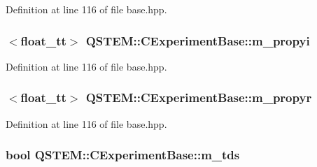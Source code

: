 Definition at line 116 of file base.\-hpp.

\hypertarget{class_q_s_t_e_m_1_1_c_experiment_base_a433626e322c45071ece6c2fe6490a0fa}{
\subsubsection[{m\-\_\-propyi}]{$<${\bf float\-\_\-tt}$>$ Q\-S\-T\-E\-M\-::\-C\-Experiment\-Base\-::m\-\_\-propyi\hspace{0.3cm}{\ttfamily [protected]}}}\label{class_q_s_t_e_m_1_1_c_experiment_base_a433626e322c45071ece6c2fe6490a0fa}


Definition at line 116 of file base.\-hpp.

\hypertarget{class_q_s_t_e_m_1_1_c_experiment_base_a4416f0b049a617d05979a896b97422b3}{
\subsubsection[{m\-\_\-propyr}]{$<${\bf float\-\_\-tt}$>$ Q\-S\-T\-E\-M\-::\-C\-Experiment\-Base\-::m\-\_\-propyr\hspace{0.3cm}{\ttfamily [protected]}}}\label{class_q_s_t_e_m_1_1_c_experiment_base_a4416f0b049a617d05979a896b97422b3}


Definition at line 116 of file base.\-hpp.

\hypertarget{class_q_s_t_e_m_1_1_c_experiment_base_a051c3e8c0ca249dffcb99917b14ed8ab}{
\subsubsection[{m\-\_\-tds}]{\setlength{\rightskip}{0pt plus 5cm}bool Q\-S\-T\-E\-M\-::\-C\-Experiment\-Base\-::m\-\_\-tds\hspace{0.3cm}{\ttfamily [protected]}}}\label{class_q_s_t_e_m_1_1_c_experiment_base_a051c3e8c0ca249dffcb99917b14ed8ab}


